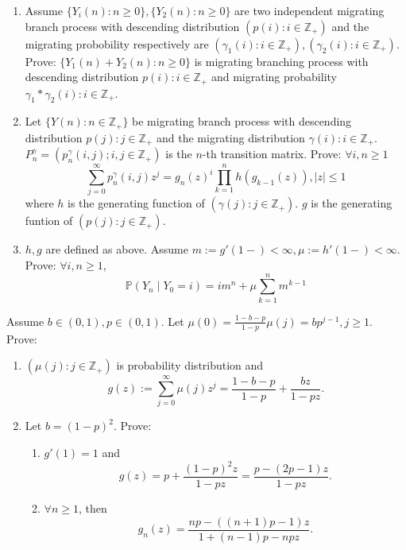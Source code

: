\documentclass{ctexart}
\newif\ifpreface
\begin{document}
\large
\setlength{\baselineskip}{1.2em}
\ifpreface
    
\else
\fi
{}
\begin{problem}\label{pro:1}
  \begin{enumerate}
    \item   Assume \(\{Y_i(n):n \geq 0\}, \{Y_2(n):n \geq 0\}\) are two independent migrating branch process with descending distribution 
  \((p(i):i \in \mathbb{Z}_+)\) and the migrating probobility respectively are \((\gamma_1(i): i \in \mathbb{Z}_{+}),(\gamma_2(i): i \in \mathbb{Z}_+)\). 
  Prove: \(\{Y_1(n )+ Y_2(n): n \geq 0\}\) is migrating branching process with descending distribution \(p(i): i \in \mathbb{Z}_+\) 
  and migrating probability \(\gamma_1 * \gamma_2(i): i \in \mathbb{Z}_+\).
\item   Let \(\{Y(n): n \in \mathbb{Z}_+\}\) be migrating branch process with descending distribution \(p(j): j \in \mathbb{Z}_+\)
  and the migrating distribution \(\gamma(i): i \in \mathbb{Z}_+\). 
  \(P_n^\gamma=(p_n^\gamma (i,j); i,j \in \mathbb{Z}_+)\) is the \(n\)-th transition matrix. 
  Prove: \(\forall i,n \geq 1\)
  \[
    \sum_{j=0}^{\infty} p_n^\gamma(i,j)z^j = g_n(z)^i \prod_{k=1}^{n} h(g_{k-1}(z)), |z| \leq 1
  \]
  where \(h\) is the generating function of \((\gamma(j): j \in \mathbb{Z}_+)\).
  \(g\) is the generating funtion of \((p(j): j \in \mathbb{Z}_+)\).
\item  \(h,g\) are defined as above. Assume \(m :=g'(1-) < \infty, \mu:=h'(1-) < \infty\). 
  Prove: \(\forall i,n \geq 1\), \[
    \mathbb{P}(Y_n \mid Y_0 =i)=im^n + \mu \sum_{k=1}^{n} m^{k-1}
  \]
  \end{enumerate}
\end{problem}
\begin{problem}\label{pro:2}
  Assume \(b \in (0,1), p \in (0,1)\). Let \(\mu(0)=\frac{1-b-p}{1-p}\mu(j)=bp^{j-1},j \geq 1\). 
  Prove: 
\begin{enumerate}
  \item   \((\mu(j):j \in \mathbb{Z}_+)\) is probability distribution and \[
    g(z):=\sum_{j=0}^{\infty} \mu(j)z^j=\frac{1-b-p}{1-p} + \frac{bz}{1-pz}.
  \]

\item Let \(b =(1-p)^2\). 
  Prove: 
\begin{enumerate}
  \item   \(g'(1)=1\) and \[
    g(z)=p + \frac{(1-p)^2 z}{1-pz}=\frac{p-(2p-1)z}{1-pz}.
  \]
\item \(\forall n \geq 1\), then \[
  g_n(z)=\frac{np-((n + 1)p-1)z}{1 + (n-1)p-npz}.
\]     
\end{enumerate}
\end{enumerate}
\end{problem}
\begin{problem}\label{pro:3}

  
\end{problem}
\end{document}
